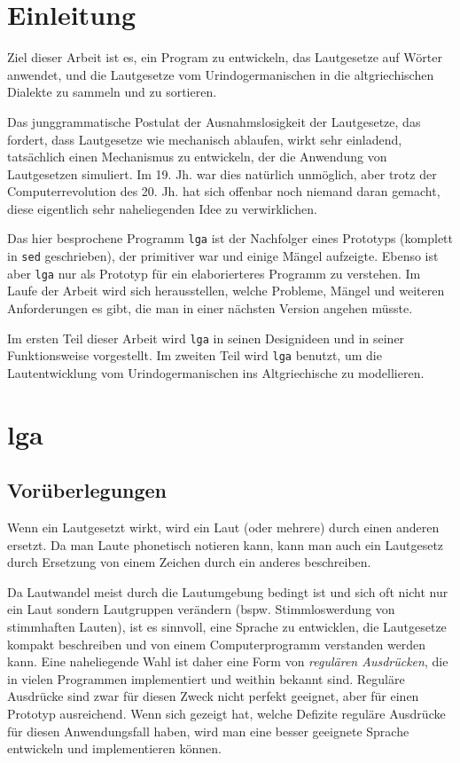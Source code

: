 \documentclass[12pt,a4paper,normalheadings]{scrartcl}
\def\tt#1{\texttt{#1}}
\begin{document}
\onehalfspacing

\section{Einleitung}

Ziel dieser Arbeit ist es, ein Program zu entwickeln,
das Lautgesetze auf Wörter anwendet,
und die Lautgesetze vom Urindogermanischen in die altgriechischen Dialekte
zu sammeln und zu sortieren.

Das junggrammatische Postulat der Ausnahmslosigkeit der Lautgesetze,
das fordert, dass Lautgesetze wie mechanisch ablaufen,
wirkt sehr einladend,
tatsächlich einen Mechanismus zu entwickeln,
der die Anwendung von Lautgesetzen simuliert.
Im 19. Jh. war dies natürlich unmöglich,
aber trotz der Computerrevolution des 20. Jh. hat sich offenbar
noch niemand daran gemacht,
diese eigentlich sehr naheliegenden Idee zu verwirklichen.

Das hier besprochene Programm \tt{lga} ist
der Nachfolger eines Prototyps (komplett in \tt{sed} geschrieben),
der primitiver war und einige Mängel aufzeigte.
Ebenso ist aber \tt{lga} nur als Prototyp
für ein elaborierteres Programm zu verstehen.
Im Laufe der Arbeit wird sich herausstellen,
welche Probleme, Mängel und weiteren Anforderungen es gibt,
die man in einer nächsten Version angehen müsste.

Im ersten Teil dieser Arbeit wird \tt{lga}
in seinen Designideen und in seiner Funktionsweise vorgestellt.
Im zweiten Teil wird \tt{lga} benutzt,
um die Lautentwicklung vom Urindogermanischen ins Altgriechische zu modellieren.

\section{lga}

\subsection{Vorüberlegungen}

Wenn ein Lautgesetzt wirkt,
wird ein Laut (oder mehrere) durch einen anderen ersetzt.
Da man Laute phonetisch notieren kann,
kann man auch ein Lautgesetz durch Ersetzung
von einem Zeichen durch ein anderes beschreiben.

Da Lautwandel meist durch die Lautumgebung bedingt ist
und sich oft nicht nur ein Laut sondern Lautgruppen verändern
(bspw. Stimmloswerdung von stimmhaften Lauten),
ist es sinnvoll,
eine Sprache zu entwicklen,
die Lautgesetze kompakt beschreiben
und von einem Computerprogramm verstanden werden kann.
Eine naheliegende Wahl ist daher eine Form von \emph{regulären Ausdrücken},
die in vielen Programmen implementiert und weithin bekannt sind.
Reguläre Ausdrücke sind zwar für diesen Zweck nicht perfekt geeignet,
aber für einen Prototyp ausreichend.
Wenn sich gezeigt hat,
welche Defizite reguläre Ausdrücke für diesen Anwendungsfall haben,
wird man eine besser geeignete Sprache entwickeln und implementieren können.
\end{document}
